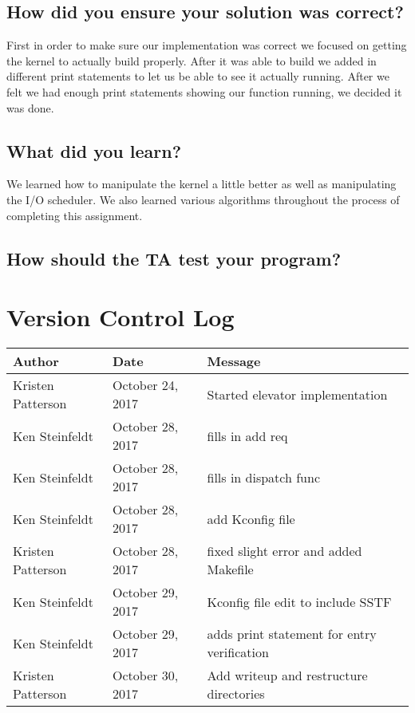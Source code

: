 \documentclass[10pt,letterpaper,onecolumn,draftclsnofoot]{IEEEtran}
\begin{document}
\subsection{How did you ensure your solution was correct?}
First in order to make sure our implementation was correct we focused on getting the kernel to actually build properly. After it was able to build we added in different print statements to let us be able to see it actually running. After we felt we had enough print statements showing our function running, we decided it was done.

\subsection{What did you learn?}
We learned how to manipulate the kernel a little better as well as manipulating the I/O scheduler. We also learned various algorithms throughout the process of completing this assignment.

\subsection{How should the TA test your program?}

\section{Version Control Log}

\begin{center}
	\begin{tabular}{|l|l|l|}
		\hline
		\textbf{Author} & \textbf{Date} & \textbf{Message} \\ \hline
		Kristen Patterson & October 24, 2017 & Started elevator implementation \\ \hline
		Ken Steinfeldt & October 28, 2017 & fills in add req \\ \hline
		Ken Steinfeldt & October 28, 2017 & fills in dispatch func \\ \hline
		Ken Steinfeldt & October 28, 2017 & add Kconfig file \\ \hline
		Kristen Patterson & October 28, 2017 & fixed slight error and added Makefile \\ \hline
		Ken Steinfeldt & October 29, 2017 & Kconfig file edit to include SSTF \\ \hline
		Ken Steinfeldt & October 29, 2017 & adds print statement for entry verification \\ \hline
		Kristen Patterson & October 30, 2017 & Add writeup and restructure directories \\ \hline
	\end{tabular}
\end{center}
\end{document}
